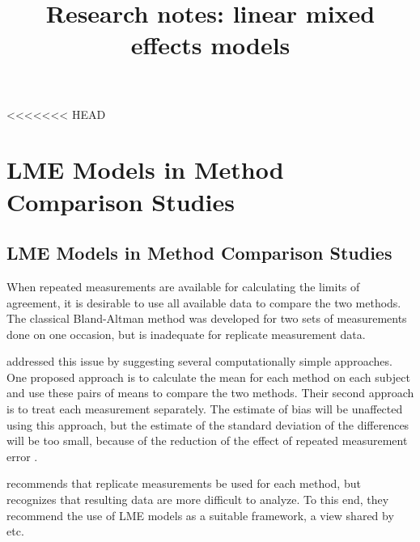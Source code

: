 \documentclass[12pt, a4paper]{report}
\title{Research notes: linear mixed effects models}
\author{ } \date{ }
\theoremstyle{plain}
\theoremstyle{definition}
\theoremstyle{remark}
\begin{document}
<<<<<<< HEAD
	\tableofcontents

\chapter{LME Models in Method Comparison Studies}
	
\section{LME Models in Method Comparison Studies}
	
When repeated measurements are available for calculating the limits of agreement, it is desirable to use all available data to compare the two methods. The classical Bland-Altman method was developed for two sets of measurements done on one occasion, but is inadequate for replicate measurement data. 
	
\citet{BA99} addressed this issue by suggesting several computationally simple approaches.  One proposed approach is to calculate the mean for each method on each subject and use these pairs of means to compare the two methods. Their second approach is to treat each measurement separately. The estimate of bias will be unaffected using this approach, but the estimate of the standard deviation of the differences will be too small, because of the reduction of the effect of repeated measurement error \citep{BXC2004,BXC2008}. 
	
	\citet{BXC2008} recommends that replicate measurements be used for each method, but recognizes that resulting data are more difficult to analyze. To this end, they recommend the use of LME models as a suitable framework, a view shared by \citet{ARoy2009} etc.
	
	
	
	
\end{document}
